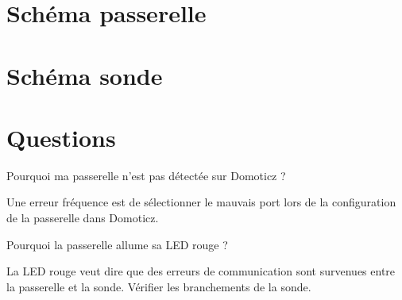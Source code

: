  \chapter{Schéma passerelle}


 \chapter{Schéma sonde}



 \chapter{Questions}

 \begin{question} 
   Pourquoi ma passerelle n'est pas détectée sur Domoticz ?
 \end{question}
 
 \begin{reponse}
  Une erreur fréquence est de sélectionner le mauvais port lors de la configuration de la passerelle dans Domoticz.\\
 \end{reponse}
 
 
 \begin{question} 
   Pourquoi la passerelle allume sa LED rouge ?
 \end{question}
 
 \begin{reponse}
  La LED rouge veut dire que des erreurs de communication sont survenues entre la passerelle et la sonde. Vérifier les branchements de la sonde. 
 \end{reponse}


